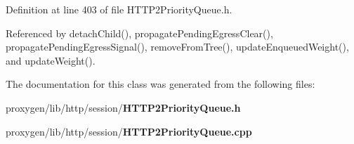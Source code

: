 Definition at line 403 of file H\+T\+T\+P2\+Priority\+Queue.\+h.



Referenced by detach\+Child(), propagate\+Pending\+Egress\+Clear(), propagate\+Pending\+Egress\+Signal(), remove\+From\+Tree(), update\+Enqueued\+Weight(), and update\+Weight().



The documentation for this class was generated from the following files\+:\begin{DoxyCompactItemize}
\item 
proxygen/lib/http/session/{\bf H\+T\+T\+P2\+Priority\+Queue.\+h}\item 
proxygen/lib/http/session/{\bf H\+T\+T\+P2\+Priority\+Queue.\+cpp}\end{DoxyCompactItemize}

